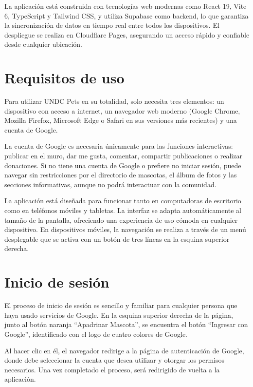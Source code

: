 \documentclass[12pt,a4paper]{article}
\begin{document}
La aplicación está construida con tecnologías web modernas como React 19, Vite 6, TypeScript y Tailwind CSS, y utiliza Supabase como backend, lo que garantiza la sincronización de datos en tiempo real entre todos los dispositivos. El despliegue se realiza en Cloudflare Pages, asegurando un acceso rápido y confiable desde cualquier ubicación.

\section{Requisitos de uso}

Para utilizar UNDC Pets en su totalidad, solo necesita tres elementos: un dispositivo con acceso a internet, un navegador web moderno (Google Chrome, Mozilla Firefox, Microsoft Edge o Safari en sus versiones más recientes) y una cuenta de Google.

La cuenta de Google es necesaria únicamente para las funciones interactivas: publicar en el muro, dar me gusta, comentar, compartir publicaciones o realizar donaciones. Si no tiene una cuenta de Google o prefiere no iniciar sesión, puede navegar sin restricciones por el directorio de mascotas, el álbum de fotos y las secciones informativas, aunque no podrá interactuar con la comunidad.

La aplicación está diseñada para funcionar tanto en computadoras de escritorio como en teléfonos móviles y tabletas. La interfaz se adapta automáticamente al tamaño de la pantalla, ofreciendo una experiencia de uso cómoda en cualquier dispositivo. En dispositivos móviles, la navegación se realiza a través de un menú desplegable que se activa con un botón de tres líneas en la esquina superior derecha.

\section{Inicio de sesión}

El proceso de inicio de sesión es sencillo y familiar para cualquier persona que haya usado servicios de Google. En la esquina superior derecha de la página, junto al botón naranja ``Apadrinar Mascota'', se encuentra el botón ``Ingresar con Google'', identificado con el logo de cuatro colores de Google.

Al hacer clic en él, el navegador redirige a la página de autenticación de Google, donde debe seleccionar la cuenta que desea utilizar y otorgar los permisos necesarios. Una vez completado el proceso, será redirigido de vuelta a la aplicación.
\end{document}
